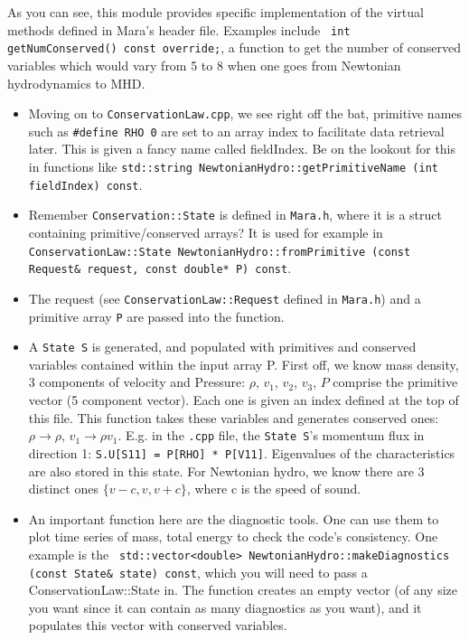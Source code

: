\documentclass{article}
\begin{document}
As you can see, this module provides specific implementation of the virtual methods defined in Mara's header file. Examples include \texttt{  int getNumConserved() const override;}, a function to get the number of conserved variables which would vary from 5 to 8 when one goes from Newtonian hydrodynamics to MHD. 
\begin{itemize}
\item Moving on to \texttt{ConservationLaw.cpp}, we see right off the bat, primitive names such as \texttt{\#define RHO 0} are set to an array index to facilitate data retrieval later. This is given a fancy name called fieldIndex. Be on the lookout for this in functions like \texttt{std::string NewtonianHydro::getPrimitiveName (int fieldIndex) const}.

\item Remember \texttt{Conservation::State} is defined in \texttt{Mara.h}, where it is a struct containing primitive/conserved arrays? It is used for example in \texttt{ConservationLaw::State NewtonianHydro::fromPrimitive (const Request\& request, const double* P) const}. 

\item The request (see \texttt{ConservationLaw::Request} defined in \texttt{Mara.h}) and a primitive array \texttt{P} are passed into the function. 

\item A \texttt{State S} is generated, and populated with primitives and conserved variables contained within the input array P. First off, we know mass density, 3 components of velocity and Pressure: $\rho$, $v_1$, $v_2$, $v_3$, $P$ comprise the primitive vector (5 component vector). Each one is given an index defined at the top of this file. This function takes these variables and generates conserved ones: $\rho \rightarrow \rho$, $v_1 \rightarrow	\rho v_1$. E.g. in the \texttt{.cpp} file, the \texttt{State S}'s momentum flux in direction 1: \texttt{S.U[S11] = P[RHO] * P[V11]}. Eigenvalues of the characteristics are also stored in this state. For Newtonian hydro, we know there are 3 distinct ones $\{v-c,v,v+c\}$, where c is the speed of sound.

\item An important function here are the diagnostic tools. One can use them to plot time series of mass, total energy to check the code's consistency. One example is the \texttt{ std::vector<double> NewtonianHydro::makeDiagnostics (const State\& state) const}, which you will need to pass a ConservationLaw::State in. The function creates an empty vector (of any size you want since it can contain as many diagnostics as you want), and it populates this vector with conserved variables.


\end{itemize}
\end{document}
